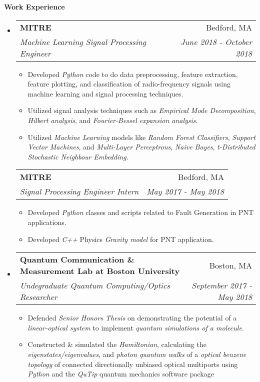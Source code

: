\documentclass[letterpaper, 8pt]{extarticle}
\makeatletter
\newcommand{\resitem}[1]{\item #1 \vspace{-2pt}}
\newcommand{\resheading}[1]{{\large \colorbox{mygrey}{\begin{minipage}{0.99\textwidth}{\textbf{#1 \vphantom{p\^{E}}}}\end{minipage}}}}
\newcommand{\ressubheading}[4]{
\begin{tabular*}{7.0in}{l@{\extracolsep{\fill}}r}
		\textbf{#1} & #2 \\
		\textit{#3} & \textit{#4} \\
\end{tabular*}\vspace{-6pt}}
\makeatother
\begin{document}
\resheading{Work Experience}
\begin{itemize}
\setlength{\leftmargini}{0.5em}
\item
	\ressubheading{MITRE}{Bedford, MA}{Machine Learning Signal Processing Engineer}{June 2018 - October 2018}
	\begin{itemize}
		\resitem{Developed \emph{Python} code to do data preprocessing, feature extraction, feature plotting, and classification of radio-frequency signals using machine learning and signal processing techniques.}
        \resitem{Utilized signal analysis techniques such as \emph{Empirical Mode Decomposition}, \emph{Hilbert analysis}, and \emph{Fourier-Bessel expansion analysis}.}
        \resitem{Utilized \emph{Machine Learning} models like \emph{Random Forest Classifiers}, \emph{Support Vector Machines}, and \emph{Multi-Layer Perceptrons}, \emph{Naive Bayes}, \emph{t-Distributed Stochastic Neighbour Embedding}.}
	\end{itemize}
	\ressubheading{MITRE }{Bedford, MA}{Signal Processing Engineer Intern}{May 2017 - May 2018}
	\begin{itemize}
		\resitem{Developed \emph{Python} classes and scripts related to Fault Generation in PNT applications.}
		\resitem{Developed \emph{C++} Physics \emph{Gravity model} for PNT application.}
	\end{itemize}
\item
	\ressubheading{Quantum Communication \& Measurement Lab at Boston University}{Boston, MA}{Undegraduate Quantum Computing/Optics Researcher}{September 2017 - May 2018}
	\begin{itemize}
	    \resitem{Defended \emph{Senior Honors Thesis} on demonstrating the potential of a \emph{linear-optical system} to implement \emph{quantum simulations of a molecule}.}
        \resitem{Constructed \& simulated the \emph{Hamiltonian}, calculating the \emph{eigenstates/eigenvalues}, and \emph{photon quantum walks} of a \emph{optical benzene topology} of connected directionally unbiased optical multiports using \emph{Python} and the \emph{QuTip} quantum mechanics software package}

\end{itemize}
\end{itemize}
\end{document}
